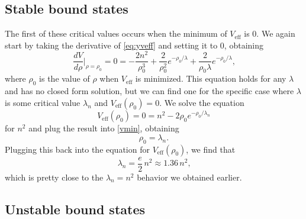 \documentclass[12pt,twoside]{reedthesis}
\begin{document}
\subsection{Stable bound states}
The first of these critical values occurs when the minimum of $V_{\mathrm{eff}}$ is 0. We again start by taking the derivative of \eqref{eq:yveff} and setting it to 0, obtaining
\begin{equation}
\frac{dV}{d\rho}\Big |_{\rho = \rho_0} =0 = -\frac{2n^2}{\rho_0^3} + \frac{2}{\rho_0^2}e^{-\rho_0/\lambda} + \frac{2}{\rho_0 \lambda} e^{-\rho_0/\lambda}\mbox{,}
\label{vmin}
\end{equation}
where $\rho_0$ is the value of $\rho$ when $V_{\mathrm{eff}}$ is minimized. This equation holds for any $\lambda$ and has no closed form solution, but we can find one for the specific case where $\lambda$ is some critical value $\lambda_n$ and $V_{\mathrm{eff}}(\rho_0) = 0$. We solve the equation
\begin{equation}
V_{\mathrm{eff}}(\rho_0)=0 = n^2 - 2\rho_0 e^{-\rho_0/\lambda_n} 
\end{equation}
for $n^2$
and plug the result into \eqref{vmin}, obtaining
\begin{equation}
\rho_0 = \lambda_n \mbox{.}
\end{equation}
Plugging this back into the equation for $V_{\mathrm{eff}}(\rho_0)$, we find that
\begin{equation}
\lambda_n=\frac{e}{2}\, n^2\approx 1.36\, n^2\mbox{,}
\label{eq:stable}
\end{equation}
which is pretty close to the $\lambda_{n} = n^2$ behavior we obtained earlier.

\subsection{Unstable bound states}
\end{document}
